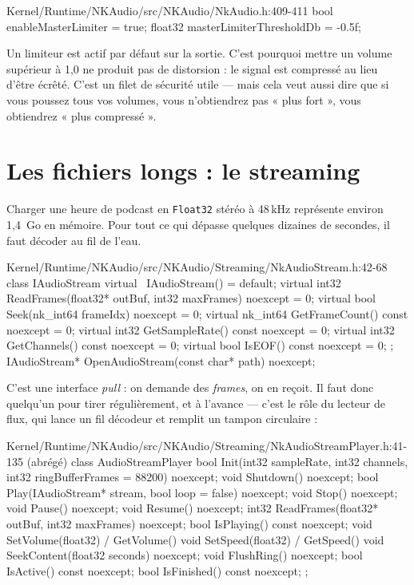 \begin{nkretenir}
\begin{nkcode}{Kernel/Runtime/NKAudio/src/NKAudio/NkAudio.h:409-411}
            bool enableMasterLimiter = true;
            float32 masterLimiterThresholdDb = -0.5f;
\end{nkcode}
Un limiteur est actif par défaut sur la sortie. C'est pourquoi mettre un volume
supérieur à 1,0 ne produit pas de distorsion : le signal est compressé au lieu
d'être écrêté. C'est un filet de sécurité utile — mais cela veut aussi dire que
si vous poussez tous vos volumes, vous n'obtiendrez pas « plus fort », vous
obtiendrez « plus compressé ».
\end{nkretenir}

\section{Les fichiers longs : le streaming}

Charger une heure de podcast en \texttt{Float32} stéréo à 48\,kHz représente
environ 1,4~Go en mémoire. Pour tout ce qui dépasse quelques dizaines de
secondes, il faut décoder au fil de l'eau.

\begin{nkcode}{Kernel/Runtime/NKAudio/src/NKAudio/Streaming/NkAudioStream.h:42-68}
    class IAudioStream {
            virtual ~IAudioStream() = default;
            virtual int32   ReadFrames(float32* outBuf, int32 maxFrames) noexcept = 0;
            virtual bool    Seek(nk_int64 frameIdx) noexcept = 0;
            virtual nk_int64 GetFrameCount() const noexcept = 0;
            virtual int32   GetSampleRate() const noexcept = 0;
            virtual int32   GetChannels() const noexcept = 0;
            virtual bool    IsEOF() const noexcept = 0;
    };
    IAudioStream* OpenAudioStream(const char* path) noexcept;
\end{nkcode}

C'est une interface \emph{pull} : on demande des \emph{frames}, on en reçoit. Il
faut donc quelqu'un pour tirer régulièrement, et à l'avance — c'est le rôle du
lecteur de flux, qui lance un fil décodeur et remplit un tampon circulaire :

\begin{nkcode}{Kernel/Runtime/NKAudio/src/NKAudio/Streaming/NkAudioStreamPlayer.h:41-135 (abrégé)}
    class AudioStreamPlayer {
            bool Init(int32 sampleRate, int32 channels, int32 ringBufferFrames = 88200) noexcept;
            void Shutdown() noexcept;
            bool Play(IAudioStream* stream, bool loop = false) noexcept;
            void Stop() noexcept;  void Pause() noexcept;  void Resume() noexcept;
            int32 ReadFrames(float32* outBuf, int32 maxFrames) noexcept;
            bool IsPlaying() const noexcept;
            void SetVolume(float32) / GetVolume()
            void SetSpeed(float32) / GetSpeed()
            void SeekContent(float32 seconds) noexcept;
            void FlushRing() noexcept;
            bool IsActive() const noexcept;  bool IsFinished() const noexcept;
    };
\end{nkcode}

